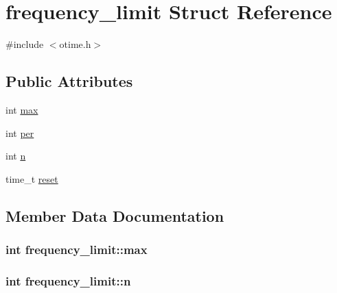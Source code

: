\hypertarget{structfrequency__limit}{}\section{frequency\+\_\+limit Struct Reference}
\label{structfrequency__limit}


{\ttfamily \#include $<$otime.\+h$>$}

\subsection*{Public Attributes}
\begin{DoxyCompactItemize}
\item 
int \hyperlink{structfrequency__limit_ad4caff9307e2af849010c576f151c97d}{max}
\item 
int \hyperlink{structfrequency__limit_a7803a1143f72bd05d48b1fc12b9ffeac}{per}
\item 
int \hyperlink{structfrequency__limit_aa264dd92819217eb90e8b427cbf70bd3}{n}
\item 
time\+\_\+t \hyperlink{structfrequency__limit_a36d1935eca475d06125896694e28627c}{reset}
\end{DoxyCompactItemize}


\subsection{Member Data Documentation}
\hypertarget{structfrequency__limit_ad4caff9307e2af849010c576f151c97d}{}
\subsubsection[{max}]{\setlength{\rightskip}{0pt plus 5cm}int frequency\+\_\+limit\+::max}\label{structfrequency__limit_ad4caff9307e2af849010c576f151c97d}
\hypertarget{structfrequency__limit_aa264dd92819217eb90e8b427cbf70bd3}{}
\subsubsection[{n}]{\setlength{\rightskip}{0pt plus 5cm}int frequency\+\_\+limit\+::n}\label{structfrequency__limit_aa264dd92819217eb90e8b427cbf70bd3}
\hypertarget{structfrequency__limit_a7803a1143f72bd05d48b1fc12b9ffeac}{}
